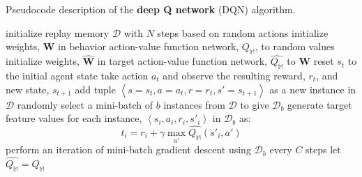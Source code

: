 \documentclass[xcolor={table}]{beamer}
\newcommand{\keyword}[1]{{\textbf{#1}}\index{#1}}
\begin{document}
\begin{frame}[plain]
\scriptsize{Pseudocode description of the \keyword{deep Q network} (DQN) algorithm.}
\begin{footnotesize}
\begin{algorithmic}[1]
\State initialize replay memory $\mathcal{D}$ with $N$ steps based on random actions
\State initialize weights, $\mathbf{W}$  in behavior action-value function network, $Q_{\mathbb{M}}$, to random values
\State initialize weights, $\widehat{\mathbf{W}}$  in target action-value function network, $\widehat{Q_{\mathbb{M}}}$ to $\mathbf{W}$
\State reset $s_{t}$ to the initial agent state
\Repeat
    \label{alg_ln:nnql_choose_action}
    \label{alg_ln:nnql_take_action}
    \State take action $a_{t}$ and observe the resulting reward, $r_{t}$, and new state, $s_{t+1}$
    \State add tuple $\left<s=s_t, a=a_t, r=r_t, s'=s_{t+1}\right>$ as a new instance in $\mathcal{D}$
    \State randomly select a mini-batch of $b$ instances from $\mathcal{D}$ to give $\mathcal{D}_{b}$
    \State generate target feature values for each instance, $\left<s_i, a_i, r_i, s'_{i}\right>$ in $\mathcal{D}_{b}$ as: 
     \begin{equation*}
     t_i = r_i +\gamma\max_{a'}\widehat{Q_{\mathbb{M}}}\left(s'_{i}, a'\right)
     \end{equation*}
     \State perform an iteration of mini-batch gradient descent using $\mathcal{D}_{b}$
     \State every $C$ steps let $\widehat{Q_{\mathbb{M}}} = Q_{\mathbb{M}}$
\EndFor
\end{algorithmic}
\end{footnotesize}
\end{frame} 
\end{document}
